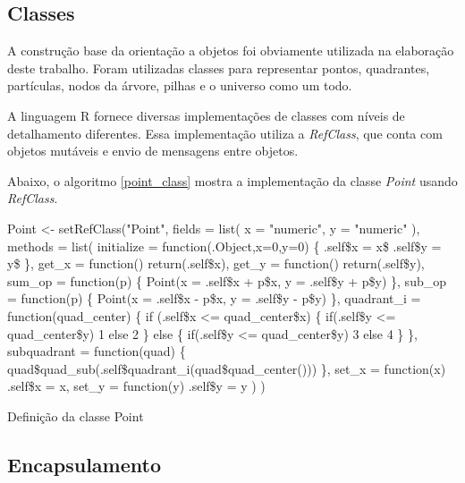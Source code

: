 \documentclass[rel_mlp]{iiufrgs}
\makeatletter
\newcommand{\nosemic}{\renewcommand{\@endalgocfline}{\relax}}%
\makeatother
\begin{document}
\subsection{Classes}

    A construção base da orientação a objetos foi obviamente utilizada na elaboração deste trabalho.
    Foram utilizadas classes para representar pontos, quadrantes, partículas, nodos da árvore, pilhas e
    o universo como um todo.

    A linguagem R fornece diversas implementações de classes \cite{RClasses} com níveis de detalhamento diferentes.
    Essa implementação utiliza a \textit{RefClass}, que conta com objetos mutáveis e envio de mensagens
    entre objetos.

    Abaixo, o algoritmo \ref{point_class} mostra a implementação da classe \textit{Point} usando \textit{RefClass}.

\begin{algorithm}
  \label{point_class}
\nosemic Point <- setRefClass("Point",\;
\nosemic  fields = list(\;
\nosemic    x = "numeric",\;
\nosemic    y = "numeric"\;
\nosemic  ),\;
\nosemic  methods = list(\;
\nosemic    initialize = function(.Object,x=0,y=0) {\{} \;
\nosemic      .self{\$}x = x{\$}\;
\nosemic      .self{\$}y = y{\$}\;
\nosemic    {\}}, \;
\nosemic    get{\_}x = function() return(.self{\$}x),\;
\nosemic    get{\_}y = function() return(.self{\$}y),\;
\nosemic    sum{\_}op = function(p) {\{}\;
\nosemic      Point(x = .self{\$}x + p{\$}x, y = .self{\$}y + p{\$}y)\;
\nosemic    {\}},\;
\nosemic    sub{\_}op = function(p) {\{}\;
\nosemic      Point(x = .self{\$}x - p{\$}x, y = .self{\$}y - p{\$}y)\;
\nosemic    {\}},\;
\nosemic    quadrant{\_}i = function(quad{\_}center) {\{}\;
\nosemic      if (.self{\$}x <= quad{\_}center{\$}x) {\{}\;
\nosemic        if(.self{\$}y <= quad{\_}center{\$}y) 1 else 2\;
\nosemic      {\}} else {\{}\;
\nosemic        if(.self{\$}y <= quad{\_}center{\$}y) 3 else 4\;
\nosemic      {\}}\;
\nosemic    {\}},\;
\nosemic    subquadrant = function(quad) {\{}\;
\nosemic      quad{\$}quad{\_}sub(.self{\$}quadrant{\_}i(quad{\$}quad{\_}center()))\;
\nosemic    {\}},\;
\nosemic    set{\_}x = function(x) .self{\$}x = x,\;
\nosemic    set{\_}y = function(y) .self{\$}y = y\;
\nosemic  )\;
\nosemic )\;

\caption{Definição da classe Point}
\end{algorithm}


\subsection{Encapsulamento}
\end{document}
